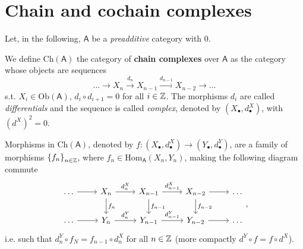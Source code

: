 \section{Chain and cochain complexes}
Let, in the following, $\mathsf{A}$ be a \textit{preadditive} category with $0$.

\begin{defn}
	We define $\mathrm{Ch}(\mathsf{A})$ the category of \textbf{chain complexes} over $\mathsf{A}$
	as the category whose objects are sequences
	\begin{equation}
	\ldots \to X_n \xrightarrow{d_n} X_{n-1}
	\xrightarrow{d_{n-1}} X_{n-2} \to \ldots
	\end{equation} 
	s.t. $X_i \in \mathrm{Ob} \left(\mathsf{A}\right)$, $d_i \circ d_{i+1} = 0$ for all $i \in \mathbb{Z}$.
	The morphisms $d_i$ are called \textit{differentials} and the sequence is called \textit{complex},
	denoted by $\left( X_{\bullet}, d^X_{\bullet} \right)$, with $\left( d^X \right)^2 = 0$.

	Morphisms in $\mathrm{Ch}(\mathsf{A})$, denoted by
	$f\colon\left(X_{\bullet}, d^X_{\bullet}\right) \to \left(Y_{\bullet}, d^Y_{\bullet}\right)$,
	are a family of morphisms $\left\{ f_n \right\}_{n \in \mathbb{Z}}$, where
	$f_n \in \mathrm{Hom}_{\mathsf{A}} \left( X_n, Y_n \right)$,
	making the following diagram commute
	\begin{equation}
	\begin{tikzcd}
		\ldots \arrow[r, "", rightarrow] &
		X_n \arrow[r, "d^X_n", rightarrow] \arrow[d, "f_n", rightarrow] &
		X_{n-1} \arrow[r, "d^X_{n-1}", rightarrow] \arrow[d, "f_{n-1}", rightarrow] &
		X_{n-2} \arrow[r, "", rightarrow] \arrow[d, "f_{n-2}", rightarrow] &
		\ldots \\
		\ldots \arrow[r, "", rightarrow] &
		Y_n \arrow[r, "d^Y_n", rightarrow]&
		Y_{n-1} \arrow[r, "d^Y_{n-1}", rightarrow] &
		Y_{n-2} \arrow[r, "", rightarrow] &
		\ldots
	\end{tikzcd}
	,\end{equation} 
	i.e. such that $d^Y_n \circ f_N = f_{n-1} \circ d^X_n$ for all $n \in \mathbb{Z}$
	(more compactly $d^Y \circ f = f \circ d^X$).
\end{defn}

